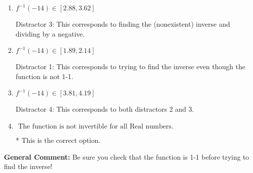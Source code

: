 \documentclass{extbook}[14pt]
\begin{document}
\begin{enumerate}
{\begin{enumerate}[label=\Alph*.]
 Distractor 2: This corresponds to finding the (nonexistent) inverse and not subtracting by the vertical shift.
\item \( f^{-1}(-14) \in [2.88, 3.62] \)

 Distractor 3: This corresponds to finding the (nonexistent) inverse and dividing by a negative.
\item \( f^{-1}(-14) \in [1.89, 2.14] \)

 Distractor 1: This corresponds to trying to find the inverse even though the function is not 1-1. 
\item \( f^{-1}(-14) \in [3.81, 4.19] \)

 Distractor 4: This corresponds to both distractors 2 and 3.
\item \( \text{ The function is not invertible for all Real numbers. } \)

* This is the correct option.
\end{enumerate}

\textbf{General Comment:} Be sure you check that the function is 1-1 before trying to find the inverse!
}
\end{enumerate}
\end{document}
